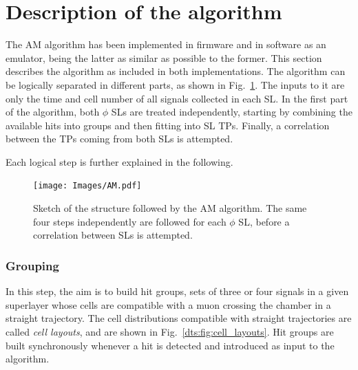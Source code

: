 \documentclass[../main.tex]{subfiles}
\begin{document}
\section{Description of the algorithm}
\label{sec:dts:description}

The AM algorithm has been implemented in firmware and in software as an emulator, being the latter as similar as possible to the former. This section describes the algorithm as included in both implementations. The algorithm can be logically separated in different parts, as shown in Fig.~\ref{dts:fig:am}. The inputs to it are only the time and cell number of all signals collected in each SL. In the first part of the algorithm, both $\phi$ SLs are treated independently, starting by combining the available hits into groups and then fitting into SL TPs. Finally, a correlation between the TPs coming from both SLs is attempted. 

Each logical step is further explained in the following.

\begin{figure}[h!]
\begin{center}
\texttt{[image: Images/AM.pdf]}
\end{center}
\caption[Analytical Method algorithm structure]{Sketch of the structure followed by the AM algorithm. The same four steps independently are followed for each $\phi$ SL, before a correlation between SLs is attempted.}
\label{dts:fig:am}
\end{figure}


\subsubsection*{Grouping}

In this step, the aim is to build hit groups, sets of three or four signals in a given superlayer whose cells are compatible with a muon crossing the chamber in a straight trajectory. The cell distributions compatible with straight trajectories are called \textit{cell layouts}, and are shown in Fig.~\ref{dts:fig:cell_layouts}. Hit groups are built synchronously whenever a hit is detected and introduced as input to the algorithm.


\end{document}
